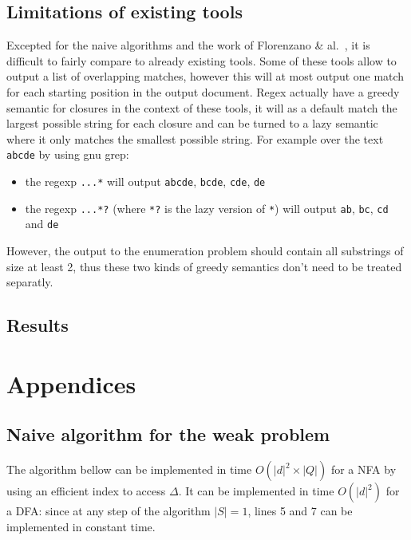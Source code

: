 \documentclass[12px]{article}
\theoremstyle{definition}
\begin{document}
    \subsection{Limitations of existing tools}

      Excepted for the naive algorithms and the work of Florenzano \&
      al.~, it is difficult to fairly compare to already
      existing tools. Some of these tools allow to output a list of overlapping
      matches, however this will at most output one match for each starting
      position in the output document. Regex actually have a greedy semantic
      for closures in the context of these tools, it will as a default match
      the largest possible string for each closure and can be turned to a lazy
      semantic where it only matches the smallest possible string. For
      example over the text \texttt{abcde} by using gnu grep:
        \begin{itemize}
          \item the regexp \texttt{...*} will output \texttt{abcde},
            \texttt{bcde}, \texttt{cde}, \texttt{de}
          \item the regexp \texttt{...*?} (where \texttt{*?} is the lazy
            version of \texttt{*}) will output \texttt{ab}, \texttt{bc},
            \texttt{cd} and \texttt{de}
        \end{itemize}
      However, the output to the enumeration problem should contain all
      substrings of size at least 2, thus these two kinds of greedy semantics
      don't need to be treated separatly.

    \subsection{Results}


  \pagebreak
  
  


  \pagebreak
  \section{Appendices}

    \subsection{Naive algorithm for the weak problem}

      The algorithm bellow can be implemented in time $O(|d|^2 \times |Q|)$ for
      a NFA by using an efficient index to access $\Delta$. It can be
      implemented in time $O(|d|^2)$ for a DFA\@: since at any step of the
      algorithm $|S| = 1$, lines 5 and 7 can be implemented in constant time.
\end{document}
